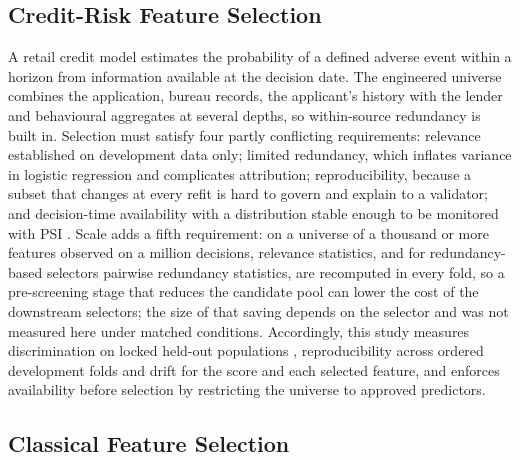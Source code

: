 \documentclass[final,5p,twocolumn]{elsarticle}
\begin{document}
\subsection{Credit-Risk Feature Selection}
\label{subsec:credit_risk_fs}

A retail credit model estimates the probability of a defined adverse event within a horizon from information available at the decision date. The engineered universe combines the application, bureau records, the applicant's history with the lender and behavioural aggregates at several depths, so within-source redundancy is built in. Selection must satisfy four partly conflicting requirements: relevance established on development data only; limited redundancy, which inflates variance in logistic regression and complicates attribution; reproducibility, because a subset that changes at every refit is hard to govern and explain to a validator; and decision-time availability with a distribution stable enough to be monitored with PSI \cite{siddiqi2006,thomas2002,yurdakul2020}. Scale adds a fifth requirement: on a universe of a thousand or more features observed on a million decisions, relevance statistics, and for redundancy-based selectors pairwise redundancy statistics, are recomputed in every fold, so a pre-screening stage that reduces the candidate pool can lower the cost of the downstream selectors; the size of that saving depends on the selector and was not measured here under matched conditions. Accordingly, this study measures discrimination on locked held-out populations \cite{bergmeir2012}, reproducibility across ordered development folds and drift for the score and each selected feature, and enforces availability before selection by restricting the universe to approved predictors.

\subsection{Classical Feature Selection}
\label{subsec:classical_fs_background}
\end{document}
